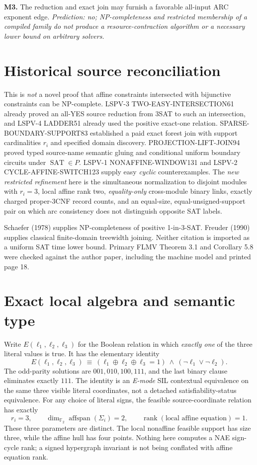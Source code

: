 \documentclass[11pt]{article}
\newcommand{\SAT}{\operatorname{SAT}}
\begin{document}
\noindent\textbf{M3.} The reduction and exact join may furnish a favorable all-input ARC exponent edge. \emph{Prediction: no; NP-completeness and restricted membership of a compiled family do not produce a resource-contraction algorithm or a necessary lower bound on arbitrary solvers.}

\section{Historical source reconciliation}
This is \emph{not} a novel proof that affine constraints intersected with bijunctive constraints can be NP-complete. LSPV-3 TWO-EASY-INTERSECTION61 already proved an all-YES source reduction from 3SAT to such an intersection, and LSPV-4 LADDER51 already used the positive exact-one relation. SPARSE-BOUNDARY-SUPPORT83 established a paid exact forest join with support cardinalities \(r_i\) and specified domain discovery. PROJECTION-LIFT-JOIN94 proved typed source-name semantic gluing and conditional uniform boundary circuits under \(\SAT\in P\). LSPV-1 NONAFFINE-WINDOW131 and LSPV-2 CYCLE-AFFINE-SWITCH123 supply easy \emph{cyclic} counterexamples. The \emph{new restricted refinement} here is the simultaneous normalization to disjoint modules with \(r_i=3\), local affine rank two, \emph{equality-only} cross-module binary links, exactly charged proper-3CNF record counts, and an equal-size, equal-unsigned-support pair on which arc consistency does not distinguish opposite SAT labels.

Schaefer (1978) supplies NP-completeness of positive 1-in-3-SAT. Freuder (1990) supplies classical finite-domain treewidth joining. Neither citation is imported as a uniform SAT time lower bound. Primary FLMV Theorem 3.1 and Corollary 5.8 were checked against the author paper, including the machine model and printed page 18.

\section{Exact local algebra and semantic type}
Write \(E(\ell_1,\ell_2,\ell_3)\) for the Boolean relation in which \emph{exactly one} of the three literal values is true. It has the elementary identity
\begin{equation}
\boxed{
E(\ell_1,\ell_2,\ell_3)\ \equiv\
(\ell_1\oplus\ell_2\oplus\ell_3=1)
\ \land\ (\neg\ell_1\vee\neg\ell_2).}
\label{eq:one}
\end{equation}
The odd-parity solutions are \(001,010,100,111\), and the last binary clause eliminates exactly \(111\). The identity is an \emph{E-mode} SIL contextual equivalence on the same three visible literal coordinates, not a detached satisfiability-status equivalence. For any choice of literal signs, the feasible source-coordinate relation has exactly
\[
r_i=3,\qquad
\dim_{\mathbb F_2}\operatorname{affspan}(\Sigma_i)=2,\qquad
\operatorname{rank}(\text{local affine equation})=1.
\]
These three parameters are distinct. The local nonaffine feasible support has size three, while the affine hull has four points. Nothing here computes a NAE sign-cycle rank; a signed hypergraph invariant is not being conflated with affine equation rank.
\end{document}
